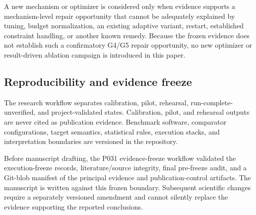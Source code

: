 A new mechanism or optimizer is considered only when evidence supports a mechanism-level repair opportunity that cannot be adequately explained by tuning, budget normalization, an existing adaptive variant, restart, established constraint handling, or another known remedy. Because the frozen evidence does not establish such a confirmatory G4/G5 repair opportunity, no new optimizer or result-driven ablation campaign is introduced in this paper.

\subsection{Reproducibility and evidence freeze}

The research workflow separates calibration, pilot, rehearsal, run-complete-unverified, and project-validated states. Calibration, pilot, and rehearsal outputs are never cited as publication evidence. Benchmark software, comparator configurations, target semantics, statistical rules, execution stacks, and interpretation boundaries are versioned in the repository.

Before manuscript drafting, the P031 evidence-freeze workflow validated the execution-freeze records, literature/source integrity, final pre-freeze audit, and a Git-blob manifest of the principal evidence and publication-control artifacts. The manuscript is written against this frozen boundary. Subsequent scientific changes require a separately versioned amendment and cannot silently replace the evidence supporting the reported conclusions.
